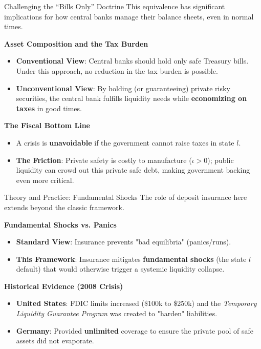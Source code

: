 \documentclass[11pt,aspectratio=169]{beamer}
\begin{document}
\begin{frame}{Challenging the ``Bills Only'' Doctrine}
\small
This equivalence has significant implications for how central banks manage their balance sheets, even in normal times.

\vspace{0.3cm}
\textbf{Asset Composition and the Tax Burden}
\begin{itemize}
    \item \textbf{Conventional View}: Central banks should hold only safe Treasury bills. Under this approach, no reduction in the tax burden is possible.
    \item \textbf{Unconventional View}: By holding (or guaranteeing) private risky securities, the central bank fulfills liquidity needs while \textbf{economizing on taxes} in good times.
\end{itemize}

\vspace{0.3cm}
\textbf{The Fiscal Bottom Line}
\begin{itemize}
    \item A crisis is \textbf{unavoidable} if the government cannot raise taxes in state $l$.
    \item \textbf{The Friction}: Private safety is costly to manufacture ($\iota > 0$); public liquidity can crowd out this private safe debt, making government backing even more critical.
\end{itemize}
\end{frame}

\begin{frame}{Theory and Practice: Fundamental Shocks}
\small
The role of deposit insurance here extends beyond the classic \textcite{diamond1983} framework.

\vspace{0.3cm}
\textbf{Fundamental Shocks vs. Panics}
\begin{itemize}
    \item \textbf{Standard View}: Insurance prevents "bad equilibria" (panics/runs).
    \item \textbf{This Framework}: Insurance mitigates \textbf{fundamental shocks} (the state $l$ default) that would otherwise trigger a systemic liquidity collapse.
\end{itemize}

\vspace{0.3cm}
\textbf{Historical Evidence (2008 Crisis)}
\begin{itemize}
    \item \textbf{United States}: FDIC limits increased (\$100k to \$250k) and the \textit{Temporary Liquidity Guarantee Program} was created to "harden" liabilities.
    \item \textbf{Germany}: Provided \textbf{unlimited} coverage to ensure the private pool of safe assets did not evaporate.
\end{itemize}
\end{frame}
\end{document}
